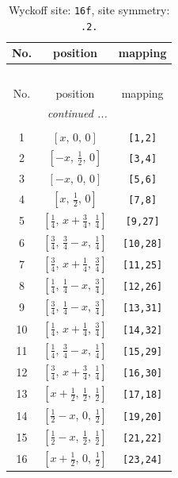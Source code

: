 \documentclass[fleqn,8pt]{jsarticle}
\begin{document}
\begin{longtable}{ccc}
\caption{Wyckoff site: {\tt 16f}, site symmetry: {\tt .2.}}
 \\
 \hline \hline
No. & position & mapping \\ \hline \endfirsthead

\multicolumn{2}{l}{\tablename\ \thetable{}} \\
 \hline \hline
No. & position & mapping \\ \hline \endhead

 \hline \hline
\multicolumn{2}{r}{\footnotesize\it continued ...} \\ \endfoot

 \hline \hline
\multicolumn{2}{r}{} \\ \endlastfoot

1 & $\left[ x,\, 0,\, 0 \right]$ & {\tt [1,2]} \\ \hline
2 & $\left[ - x,\, \frac{1}{2},\, 0 \right]$ & {\tt [3,4]} \\ \hline
3 & $\left[ - x,\, 0,\, 0 \right]$ & {\tt [5,6]} \\ \hline
4 & $\left[ x,\, \frac{1}{2},\, 0 \right]$ & {\tt [7,8]} \\ \hline
5 & $\left[ \frac{1}{4},\, x + \frac{3}{4},\, \frac{1}{4} \right]$ & {\tt [9,27]} \\ \hline
6 & $\left[ \frac{3}{4},\, \frac{3}{4} - x,\, \frac{1}{4} \right]$ & {\tt [10,28]} \\ \hline
7 & $\left[ \frac{3}{4},\, x + \frac{1}{4},\, \frac{3}{4} \right]$ & {\tt [11,25]} \\ \hline
8 & $\left[ \frac{1}{4},\, \frac{1}{4} - x,\, \frac{3}{4} \right]$ & {\tt [12,26]} \\ \hline
9 & $\left[ \frac{3}{4},\, \frac{1}{4} - x,\, \frac{3}{4} \right]$ & {\tt [13,31]} \\ \hline
10 & $\left[ \frac{1}{4},\, x + \frac{1}{4},\, \frac{3}{4} \right]$ & {\tt [14,32]} \\ \hline
11 & $\left[ \frac{1}{4},\, \frac{3}{4} - x,\, \frac{1}{4} \right]$ & {\tt [15,29]} \\ \hline
12 & $\left[ \frac{3}{4},\, x + \frac{3}{4},\, \frac{1}{4} \right]$ & {\tt [16,30]} \\ \hline
13 & $\left[ x + \frac{1}{2},\, \frac{1}{2},\, \frac{1}{2} \right]$ & {\tt [17,18]} \\ \hline
14 & $\left[ \frac{1}{2} - x,\, 0,\, \frac{1}{2} \right]$ & {\tt [19,20]} \\ \hline
15 & $\left[ \frac{1}{2} - x,\, \frac{1}{2},\, \frac{1}{2} \right]$ & {\tt [21,22]} \\ \hline
16 & $\left[ x + \frac{1}{2},\, 0,\, \frac{1}{2} \right]$ & {\tt [23,24]} \\
\end{longtable}
\end{document}

